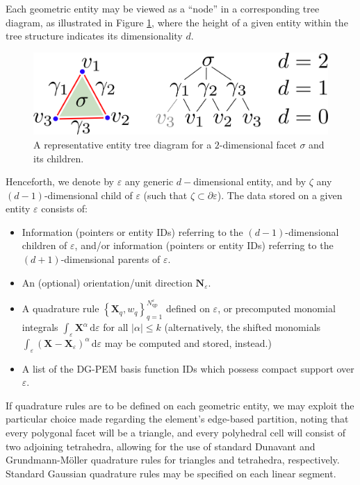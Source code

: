 	Each geometric entity may be viewed as a ``node'' in a corresponding tree diagram, as illustrated in Figure \ref{fig:entity_tree}, where the height of a given entity within the tree structure indicates its dimensionality $d$.
	\begin{figure} [!ht]
		\centering
		\includegraphics[width = 5.0in]{figures/entity_tree.pdf}
		\caption{A representative entity tree diagram for a $2$-dimensional facet $\sigma$ and its children.}
		\label{fig:entity_tree}
	\end{figure}
	
	Henceforth, we denote by $\varepsilon$ any generic $d-$dimensional entity, and by $\zeta$ any $(d-1)$-dimensional child of $\varepsilon$ (such that $\zeta \subset \partial \varepsilon$). The data stored on a given entity $\varepsilon$ consists of:
	\begin{itemize}
		\item Information (pointers or entity IDs) referring to the $(d-1)$-dimensional children of $\varepsilon$, and/or information (pointers or entity IDs) referring to the $(d+1)$-dimensional parents of $\varepsilon$.
		\item An (optional) orientation/unit direction $\bm{N}_\varepsilon$.
		\item A quadrature rule $\left\{ \bm{X}_q, w_q \right\}_{q=1}^{N^{\varepsilon}_{\mathrm q\mathrm p}}$ defined on $\varepsilon$, or precomputed monomial integrals $\int_{\varepsilon} \bm{X}^\alpha \, \mathrm d \varepsilon$ for all $|\alpha| \leq k$ (alternatively, the shifted monomials $\int_{\varepsilon} (\bm{X}-\bm{X}_{\varepsilon})^\alpha \, \mathrm d \varepsilon$ may be computed and stored, instead.)
		\item A list of the DG-PEM basis function IDs which possess compact support over $\varepsilon$.
	\end{itemize}
	
	If quadrature rules are to be defined on each geometric entity, we may exploit the particular choice made regarding the element's edge-based partition, noting that every polygonal facet will be a triangle, and every polyhedral cell will consist of two adjoining tetrahedra, allowing for the use of standard Dunavant \cite{Dunavant:85} and Grundmann-M\"{o}ller \cite{Grundmann:78} quadrature rules for triangles and tetrahedra, respectively. Standard Gaussian quadrature rules may be specified on each linear segment.
	
